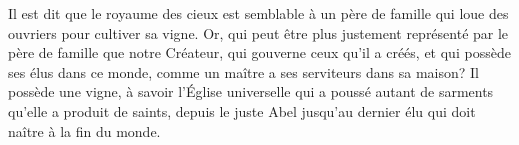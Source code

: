 Il est dit que le royaume des cieux est semblable à un père de famille
	qui loue des ouvriers pour cultiver sa vigne.
Or, qui peut être plus justement représenté par le père de famille
	que notre Créateur, qui gouverne ceux qu’il a créés,
	et qui possède ses élus dans ce monde,
	comme un maître a ses serviteurs dans sa maison?
Il possède une vigne, à savoir l’Église universelle
	qui a poussé autant de sarments qu’elle a produit de saints,
	depuis le juste Abel jusqu’au dernier élu
		qui doit naître à la fin du monde.
